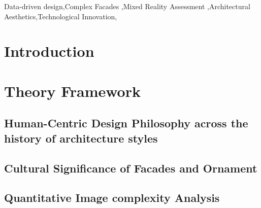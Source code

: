 \documentclass[final,5p,times]{elsarticle}
\begin{document}
\begin{frontmatter}
\begin{highlights}

\end{highlights}

\begin{keyword}
Data-driven design\sep Complex Facades \sep Mixed Reality Assessment \sep Architectural Aesthetics\sep Technological Innovation\sep

\end{keyword}

\end{frontmatter}
%
\begin{linenumbers}


\section{Introduction}
\label{sec:1Introduction}


\section{Theory Framework}
\label{sec:Theory Framework}

    \subsection{Human-Centric Design Philosophy across the history of architecture styles}
    \label{subsec:TimelineArchitectureStyles}
    

    \subsection{Cultural Significance of Facades and Ornament}
    \label{subsec:FacadeandOrnament}
    

    \subsection{Quantitative Image complexity Analysis}
    \label{subsec:ComplexityImageAnalysis}
    


\end{linenumbers}
\end{document}
